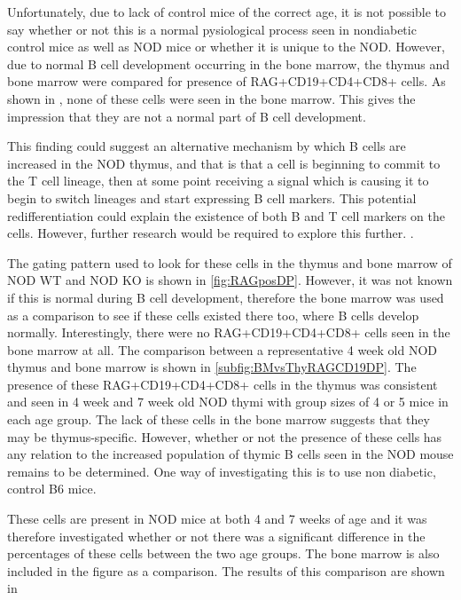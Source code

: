Unfortunately, due to lack of control mice of the correct age, it is not possible to say whether or not this is a normal pysiological process seen in nondiabetic control mice as well as NOD mice or whether it is unique to the NOD.
However, due to normal B cell development occurring in the bone marrow, the thymus and bone marrow were compared for presence of RAG+CD19+CD4+CD8+ cells.
As shown in , none of these cells were seen in the bone marrow. 
This gives the impression that they are not a normal part of B cell development.

This finding could suggest an alternative mechanism by which B cells are increased in the NOD thymus, and that is that a cell is beginning to commit to the T cell lineage, then at some point receiving a signal which is causing it to begin to switch lineages and start expressing B cell markers.
This potential redifferentiation could explain the existence of both B and T cell markers on the cells. 
However, further research would be required to explore this further. .

The gating pattern used to look for these cells in the thymus and bone marrow of NOD WT and NOD KO is shown in \cref{fig:RAGposDP}.
However, it was not known if this is normal during B cell development, therefore the bone marrow was used as a comparison to see if these cells existed there too, where B cells develop normally.
Interestingly, there were no RAG+CD19+CD4+CD8+ cells seen in the bone marrow at all. 
The comparison between a representative 4 week old NOD thymus and bone marrow is shown in \cref{subfig:BMvsThyRAGCD19DP}.
The presence of these RAG+CD19+CD4+CD8+ cells in the thymus was consistent and seen in 4 week and 7 week old NOD thymi with group sizes of 4 or 5 mice in each age group. 
The lack of these cells in the bone marrow suggests that they may be thymus-specific.
However, whether or not the presence of these cells has any relation to the increased population of thymic B cells seen in the NOD mouse remains to be determined.
One way of investigating this is to use non diabetic, control B6 mice.


These cells are present in NOD mice at both 4 and 7 weeks of age and it was therefore investigated whether or not there was a significant difference in the percentages of these cells between the two age groups. 
The bone marrow is also included in the figure as a comparison.
The results of this comparison are shown in 


